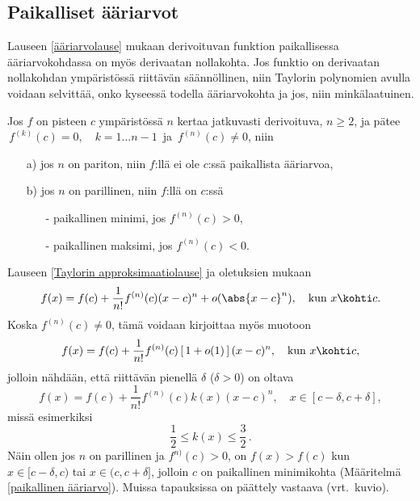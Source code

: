 \subsection*{Paikalliset ääriarvot}

Lauseen \ref{ääriarvolause} mukaan derivoituvan funktion paikallisessa ääriarvokohdassa on
myös derivaatan nollakohta. Jos funktio on derivaatan nollakohdan ympäristössä riittävän 
säännöllinen, niin Taylorin polynomien avulla voidaan selvittää, onko kyseessä todella 
ääriarvokohta ja jos, niin minkälaatuinen.
\begin{Lause} \label{Taylorin ääriarvolause}
Jos $f$ on pisteen $c$ ympäristössä $n$ kertaa jatkuvasti derivoituva, $n\geq 2$, ja pätee
$\,f^{(k)}(c)=0,\quad k=1\ldots n-1\,$ ja $\,f^{(n)}(c)\neq 0$, niin
\begin{itemize}
\item[a)] jos $n$ on pariton, niin $f$:llä ei ole $c$:ssä paikallista ääriarvoa,
\item[b)] jos $n$ on parillinen, niin $f$:llä on $c$:ssä
\begin{itemize}
\item[-] paikallinen minimi, jos $f^{(n)}(c)>0$,
\item[-] paikallinen maksimi, jos $f^{(n)}(c)<0$.
\end{itemize}
\end{itemize}
\end{Lause}
\tod Lauseen \ref{Taylorin approksimaatiolause} ja oletuksien mukaan
\[
f(x)=f(c)+\frac{1}{n!}f^{(n)}(c)(x-c)^n+o(\abs{x-c}^n), \quad \text{kun}\ x \kohti c.
\]
Koska $f^{(n)}(c)\neq 0$, tämä voidaan kirjoittaa myös muotoon
\[
f(x)=f(c)+\frac{1}{n!}f^{(n)}(c)\,[\,1+o(1)\,]\,(x-c)^n, \quad \text{kun}\ x\kohti c,
\]
jolloin nähdään, että riittävän pienellä $\delta$ ($\delta>0$) on oltava
\[
f(x)=f(c)+\frac{1}{n!}f^{(n)}(c)k(x)(x-c)^n,\quad x\in [c-\delta,c+\delta],
\]
missä esimerkiksi
\[
\frac{1}{2}\leq k(x)\leq \frac{3}{2}\,.
\]
Näin ollen jos $n$ on parillinen ja $f^{n)}(c)>0$, on $f(x)>f(c)$ kun $x\in[c-\delta,c)$ tai
$x\in(c,c+\delta]$, jolloin $c$ on paikallinen minimikohta
(Määritelmä \ref{paikallinen ääriarvo}). Muissa tapauksissa on päättely vastaava
(vrt.\ kuvio). \loppu
